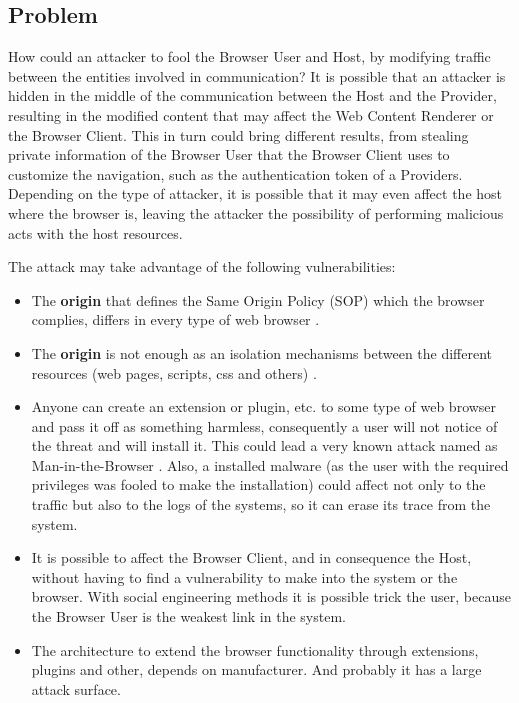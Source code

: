 \documentclass{sig-alternate-05-2015}
\begin{document}
\subsection{Problem}
How could an attacker to fool the Browser User and Host, by modifying traffic between the entities involved in communication? It is possible that an attacker is hidden in the middle of the communication between the Host and the Provider, resulting in the modified content that may affect the Web Content Renderer or the Browser Client. This in turn could bring different results, from stealing private information of the Browser User that the Browser Client uses to customize the navigation, such as the authentication token of a Providers. Depending on the type of attacker, it is possible that it may even affect the host where the browser is, leaving the attacker the possibility of performing malicious acts with the host resources.

The attack may take advantage of the following vulnerabilities:
\begin{itemize}
  \item The \textbf{origin} that defines the Same Origin Policy (SOP) which the browser complies, differs in every type of web browser \cite{W3C-SOP,Reis2009, Jackson2008, Crowley2010, Paola2006}.
  \item The \textbf{origin} is not enough as an isolation mechanisms between the different resources (web pages, scripts, css and others) \cite{Silic2010, Barth2009, Yason, Liu2012}.
  \item Anyone can create an extension or plugin, etc. to some type of web browser and pass it off as something harmless, consequently a user will not notice of the threat and will install it. This could lead a very known attack named as Man-in-the-Browser \cite{Dougan2012,Utakrit2009,Liu2012,Barth2010}. Also, a installed malware (as the user with the required privileges was fooled to make the installation) could affect not only to the traffic but also to the logs of the systems, so it can erase its trace from the system.
  \item It is possible to affect the Browser Client, and in consequence the Host, without having to find a vulnerability to make into the system or the browser. With social engineering methods it is possible trick the user, because the Browser User is the weakest link in the system.
  \item The architecture to extend the browser functionality through extensions, plugins and other, depends on manufacturer. And probably it has a large attack surface.
\end{itemize}
\end{document}
